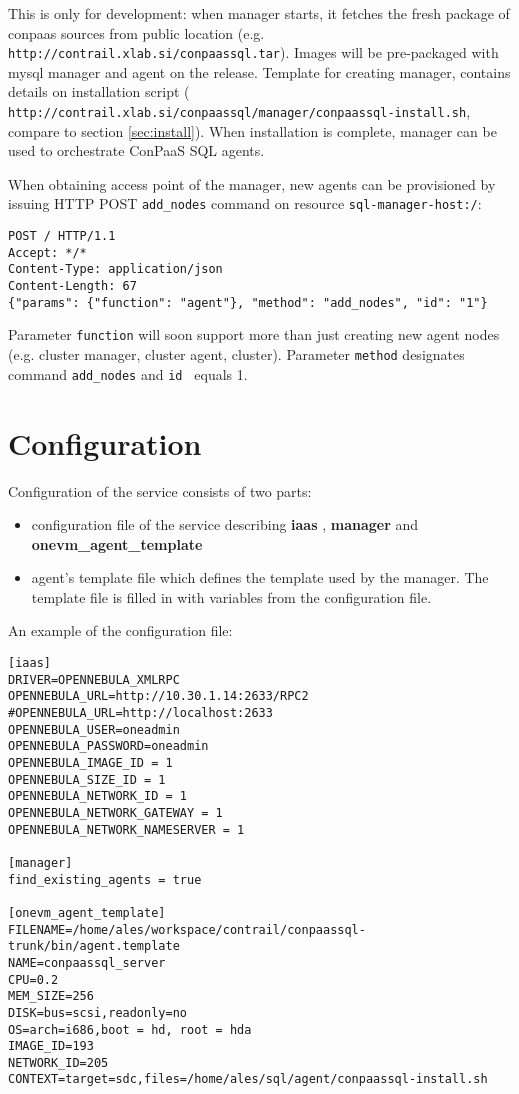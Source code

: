 \documentclass[a4paper,10pt]{article}
\begin{document}
This is only for development: when manager starts, it fetches the fresh package of conpaas sources from public location (e.g. \\{\tt http://contrail.xlab.si/conpaassql.tar}). Images will be pre-packaged with mysql manager and agent on the release. Template for creating manager, contains details on installation script (\\{\tt http://contrail.xlab.si/conpaassql/manager/conpaassql-install.sh}, compare to section \ref{sec:install}). When installation is complete, manager can be used to orchestrate ConPaaS SQL agents.

When obtaining access point of the manager, new agents can be provisioned by issuing HTTP POST {\tt add\_nodes} command on resource {\tt sql-manager-host:/}:

\begin{verbatim}
POST / HTTP/1.1
Accept: */*
Content-Type: application/json
Content-Length: 67
{"params": {"function": "agent"}, "method": "add_nodes", "id": "1"}
\end{verbatim}

Parameter {\tt function} will soon support more than just creating new agent nodes (e.g. cluster manager, cluster agent, cluster). Parameter {\tt method} designates command {\tt add\_nodes} and {\tt id } equals 1. 

\section{Configuration}

Configuration of the service consists of two parts:
\begin{itemize}
	\item configuration file of the service describing {\bf iaas }, {\bf manager} and {\bf onevm\_agent\_template}
	\item agent's template file which defines the template used by the manager. The template file is filled in with variables from the configuration file.
\end{itemize}

An example of the configuration file:
\begin{Verbatim}[frame=single]
[iaas]
DRIVER=OPENNEBULA_XMLRPC
OPENNEBULA_URL=http://10.30.1.14:2633/RPC2
#OPENNEBULA_URL=http://localhost:2633
OPENNEBULA_USER=oneadmin
OPENNEBULA_PASSWORD=oneadmin
OPENNEBULA_IMAGE_ID = 1
OPENNEBULA_SIZE_ID = 1
OPENNEBULA_NETWORK_ID = 1
OPENNEBULA_NETWORK_GATEWAY = 1
OPENNEBULA_NETWORK_NAMESERVER = 1

[manager]
find_existing_agents = true

[onevm_agent_template]
FILENAME=/home/ales/workspace/contrail/conpaassql-trunk/bin/agent.template
NAME=conpaassql_server
CPU=0.2
MEM_SIZE=256
DISK=bus=scsi,readonly=no
OS=arch=i686,boot = hd, root = hda
IMAGE_ID=193
NETWORK_ID=205
CONTEXT=target=sdc,files=/home/ales/sql/agent/conpaassql-install.sh
\end{Verbatim}
\end{document}
